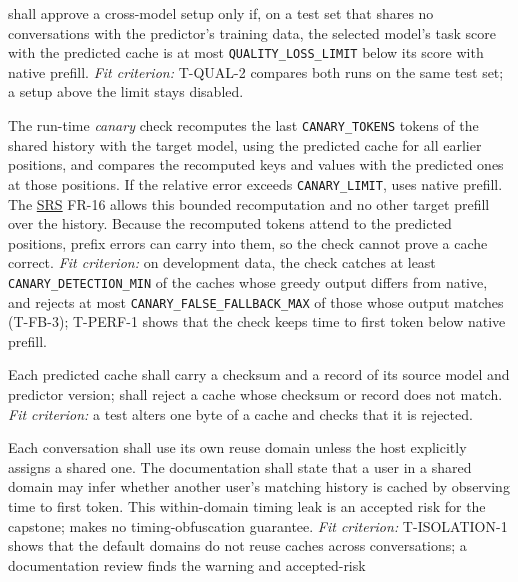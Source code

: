 \documentclass{article}
\newcommand{\srs}{\href{https://tandemkv.github.io/Tandem/SRS-Volere/SRS.pdf}{SRS}}
\begin{document}
\begin{description}[style=nextline]
  \item[SR-09 --- Limit the quality loss of each cross-model setup (H8)]
  \progname{} shall approve a cross-model setup only if, on a test set that
  shares no conversations with the predictor's training data, the selected
  model's task score with the predicted cache is at most
  \texttt{QUALITY\_LOSS\_LIMIT} below its score with native prefill.
  \emph{Fit criterion:} T-QUAL-2 compares both runs on the same test set; a
  setup above the limit stays disabled.
  \item[SR-10 --- Check predicted caches at run time (H8)] The run-time
  \emph{canary} check recomputes the last \texttt{CANARY\_TOKENS} tokens of
  the shared history with the target model, using the predicted cache for all
  earlier positions, and compares the recomputed keys and values with the
  predicted ones at those positions. If the relative error exceeds
  \texttt{CANARY\_LIMIT}, \progname{} uses native prefill. The \srs{} FR-16
  allows this bounded recomputation and no other target prefill over the
  history. Because the recomputed tokens attend to the predicted positions,
  prefix errors can carry into them, so the check cannot prove a cache
  correct. \emph{Fit criterion:} on development data, the check catches at
  least \texttt{CANARY\_DETECTION\_MIN} of the caches whose greedy output
  differs from native, and rejects at most \texttt{CANARY\_FALSE\_FALLBACK\_MAX}
  of those whose output matches (T-FB-3); T-PERF-1 shows that the check keeps
  time to first token below native prefill.
  \item[SR-11 --- Check cache integrity (H9)] Each predicted cache shall
  carry a checksum and a record of its source model and predictor version;
  \progname{} shall reject a cache whose checksum or record does not match.
  \emph{Fit criterion:} a test alters one byte of a cache and checks that it
  is rejected.
  \item[SR-12 --- Limit exposure to timing leaks (H10)] Each conversation
  shall use its own reuse domain unless the host explicitly assigns a shared
  one. The documentation shall state that a user in a shared domain may infer
  whether another user's matching history is cached by observing time to first
  token. This within-domain timing leak is an accepted risk for the capstone;
  \progname{} makes no timing-obfuscation guarantee. \emph{Fit criterion:}
  T-ISOLATION-1 shows that the default domains do not reuse caches across
  conversations; a documentation review finds the warning and accepted-risk

\end{description}
\end{document}
